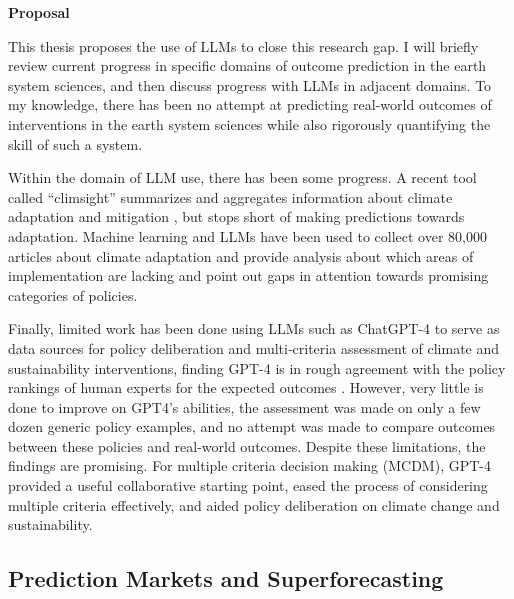\documentclass[12pt,a4paper]{article}
\begin{document}
\textbf{Proposal}

This thesis proposes the use of LLMs to close this research gap. I will briefly review current progress in specific domains of outcome prediction in the earth system sciences, and then discuss progress with LLMs in adjacent domains. To my knowledge, there has been no attempt at predicting real-world outcomes of interventions in the earth system sciences while also rigorously quantifying the skill of such a system.

Within the domain of LLM use, there has been some progress. A recent tool called ``climsight'' summarizes and aggregates information about climate adaptation and mitigation , but stops short of making predictions towards adaptation. Machine learning and LLMs have been used to collect over 80,000 articles about climate adaptation and provide analysis about which areas of implementation are lacking and point out gaps in attention towards promising categories of policies.

Finally, limited work has been done using LLMs such as ChatGPT-4 to serve as data sources for policy deliberation and multi‑criteria assessment of climate and sustainability interventions, finding GPT-4 is in rough agreement with the policy rankings of human experts for the expected outcomes . However, very little is done to improve on GPT4's abilities, the assessment was made on only a few dozen generic policy examples, and no attempt was made to compare outcomes between these policies and real-world outcomes. Despite these limitations, the findings are promising. For multiple criteria decision making (MCDM), GPT-4 provided a useful collaborative starting point, eased the process of considering multiple criteria effectively, and aided policy deliberation on climate change and sustainability.


\subsection{Prediction Markets and Superforecasting}
\end{document}

